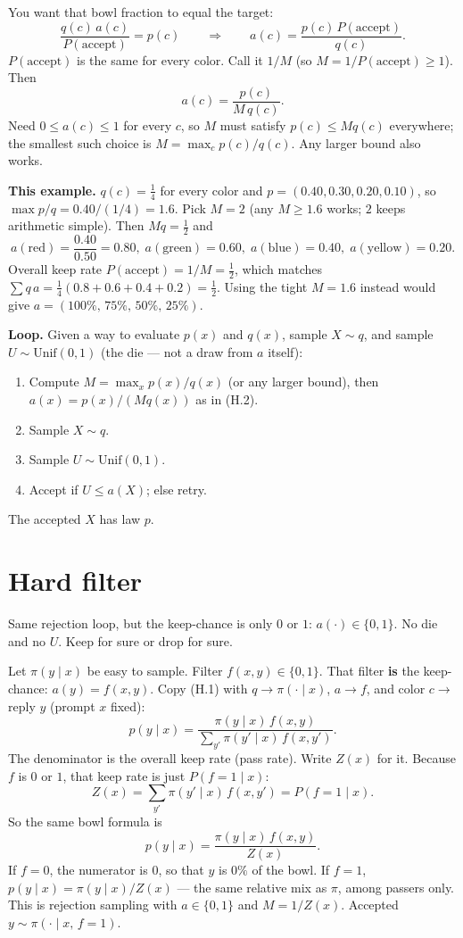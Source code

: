You want that bowl fraction to equal the target: \[
\frac{q(c)\,a(c)}{P(\mathrm{accept})}=p(c)
\qquad\Rightarrow\qquad
a(c)=\frac{p(c)\,P(\mathrm{accept})}{q(c)}.
\] $P(\mathrm{accept})$ is the same for every color. Call it $1/M$ (so $M=1/P(\mathrm{accept})\ge 1$). Then \begin{equation}
a(c)=\frac{p(c)}{M\,q(c)}.
\tag{H.2}
\end{equation} Need $0\le a(c)\le 1$ for every $c$, so $M$ must satisfy $p(c)\le M q(c)$ everywhere; the smallest such choice is $M=\max_c p(c)/q(c)$. Any larger bound also works.

\textbf{This example.} $q(c)=\tfrac14$ for every color and $p=(0.40,0.30,0.20,0.10)$, so $\max p/q=0.40/(1/4)=1.6$. Pick $M=2$ (any $M\ge 1.6$ works; $2$ keeps arithmetic simple). Then $M q=\tfrac12$ and \[
a(\mathrm{red})=\frac{0.40}{0.50}=0.80,\;
a(\mathrm{green})=0.60,\;
a(\mathrm{blue})=0.40,\;
a(\mathrm{yellow})=0.20.
\] Overall keep rate $P(\mathrm{accept})=1/M=\tfrac12$, which matches $\sum q\,a=\tfrac14(0.8+0.6+0.4+0.2)=\tfrac12$. Using the tight $M=1.6$ instead would give $a=(100\%,\,75\%,\,50\%,\,25\%)$.

\textbf{Loop.} Given a way to evaluate $p(x)$ and $q(x)$, sample $X\sim q$, and sample $U\sim\mathrm{Unif}(0,1)$ (the die --- not a draw from $a$ itself):

\begin{enumerate}
\item Compute $M=\max_x p(x)/q(x)$ (or any larger bound), then $a(x)=p(x)/(M q(x))$ as in (H.2).
\item Sample $X\sim q$.
\item Sample $U\sim\mathrm{Unif}(0,1)$.
\item Accept if $U\le a(X)$; else retry.
\end{enumerate}
The accepted $X$ has law $p$.

\section{Hard filter}\label{app:H.3}

Same rejection loop, but the keep-chance is only $0$ or $1$: $a(\cdot)\in\{0,1\}$. No die and no $U$. Keep for sure or drop for sure.

Let $\pi(y\mid x)$ be easy to sample. Filter $f(x,y)\in\{0,1\}$. That filter \textbf{is} the keep-chance: $a(y)=f(x,y)$. Copy (H.1) with $q\to\pi(\cdot\mid x)$, $a\to f$, and color $c\to$ reply $y$ (prompt $x$ fixed): \[
p(y\mid x)
=
\frac{\pi(y\mid x)\,f(x,y)}{\sum_{y'} \pi(y'\mid x)\,f(x,y')}.
\] The denominator is the overall keep rate (pass rate). Write $Z(x)$ for it. Because $f$ is $0$ or $1$, that keep rate is just $P(f=1\mid x)$: \[
Z(x)=\sum_{y'} \pi(y'\mid x)\,f(x,y')=P(f=1\mid x).
\] So the same bowl formula is \begin{equation}
p(y\mid x)=\frac{\pi(y\mid x)\,f(x,y)}{Z(x)}.
\tag{H.3}
\end{equation} If $f=0$, the numerator is $0$, so that $y$ is $0\%$ of the bowl. If $f=1$, $p(y\mid x)=\pi(y\mid x)/Z(x)$ --- the same relative mix as $\pi$, among passers only. This is rejection sampling with $a\in\{0,1\}$ and $M=1/Z(x)$. Accepted $y\sim\pi(\cdot\mid x,\,f=1)$.

